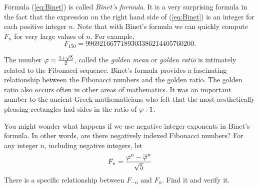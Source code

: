 Formula (\ref{eq:Binet}) is called \emph{Binet's formula}. It is a very surprising formula in the fact that the expression on the right hand side of (\ref{eq:Binet}) is an integer for each positive integer $n$. Note that with Binet's formula we can quickly compute $F_n$ for very large values of $n$. For example, 
\[F_{150} = 9969216677189303386214405760200.\]

The number $\varphi  = \frac{1+\sqrt{5}}{2}$, called the  \emph{golden mean} or \emph{golden ratio} is intimately related to the Fibonacci sequence. Binet's formula provides a fascinating relationship between the Fibonacci numbers and the golden ratio. The golden ratio also occurs often in other areas of mathematics. It was an important number to the ancient Greek mathematicians who felt that the most aesthetically pleasing rectangles had sides in the ratio of $\varphi:1$. 

\begin{pactivity} You might wonder what happens if we use negative integer exponents in Binet's formula. In other words, are there negatively indexed Fibonacci numbers? For any integer $n$, including negative integers, let 
\[F_n = \frac{\varphi^n - \overline{\varphi}^n}{\sqrt{5}}\]
There is a specific relationship between $F_{-n}$ and $F_n$. Find it and verify it. 


\end{pactivity}


